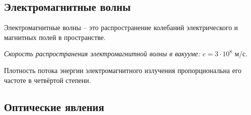 \documentclass[12pt]{article}
\begin{document}
\subsection{Электромагнитные волны}

\begin{definition}
    Электромагнитные волны -- это распространение колебаний электрического и магнитных полей в пространстве.\bigskip

    \textit{Скорость распространения электромагнитной волны в вакууме: $c=3\cdot 10^8$} м/с.
\end{definition}
\begin{law}
    Плотность потока энергии электромагнитного излучения пропорциональна его частоте в четвёртой степени.
\end{law}

\subsection{Оптические явления}
\end{document}
